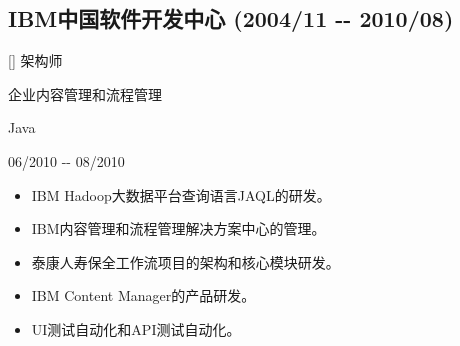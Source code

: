 \documentclass[a4paper]{article}
\newenvironment{DUlineblock}[1]{%
    \list{}{\setlength{\partopsep}{\parskip}
            \addtolength{\partopsep}{\baselineskip}
            \setlength{\topsep}{0pt}
            \setlength{\itemsep}{0.15\baselineskip}
            \setlength{\parsep}{0pt}
            \setlength{\leftmargin}{#1}}
    \raggedright
  }
  {\endlist}
\begin{document}
\begin{CJK}{UTF8}{gkai}
\subsection*{IBM中国软件开发中心 (2004/11 -{}- 2010/08)}
\begin{DUlineblock}{0em}
\item[] 架构师
\item[] 企业内容管理和流程管理
\item[] Java
\item[] 06/2010 -{}- 08/2010
\end{DUlineblock}
\begin{itemize}
\item IBM Hadoop大数据平台查询语言JAQL的研发。
\item IBM内容管理和流程管理解决方案中心的管理。
\item 泰康人寿保全工作流项目的架构和核心模块研发。
\item IBM Content Manager的产品研发。
\item UI测试自动化和API测试自动化。
\end{itemize}

\end{CJK}
\end{document}
